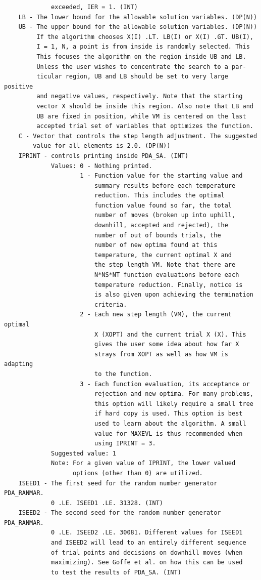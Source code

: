 \documentclass[11pt,twoside]{article}
\begin{document}
\begin{verbatim}
             exceeded, IER = 1. (INT)
    LB - The lower bound for the allowable solution variables. (DP(N))
    UB - The upper bound for the allowable solution variables. (DP(N))
         If the algorithm chooses X(I) .LT. LB(I) or X(I) .GT. UB(I),
         I = 1, N, a point is from inside is randomly selected. This
         This focuses the algorithm on the region inside UB and LB.
         Unless the user wishes to concentrate the search to a par-
         ticular region, UB and LB should be set to very large positive
         and negative values, respectively. Note that the starting
         vector X should be inside this region. Also note that LB and
         UB are fixed in position, while VM is centered on the last
         accepted trial set of variables that optimizes the function.
    C - Vector that controls the step length adjustment. The suggested
        value for all elements is 2.0. (DP(N))
    IPRINT - controls printing inside PDA_SA. (INT)
             Values: 0 - Nothing printed.
                     1 - Function value for the starting value and
                         summary results before each temperature
                         reduction. This includes the optimal
                         function value found so far, the total
                         number of moves (broken up into uphill,
                         downhill, accepted and rejected), the
                         number of out of bounds trials, the
                         number of new optima found at this
                         temperature, the current optimal X and
                         the step length VM. Note that there are
                         N*NS*NT function evaluations before each
                         temperature reduction. Finally, notice is
                         is also given upon achieving the termination
                         criteria.
                     2 - Each new step length (VM), the current optimal
                         X (XOPT) and the current trial X (X). This
                         gives the user some idea about how far X
                         strays from XOPT as well as how VM is adapting
                         to the function.
                     3 - Each function evaluation, its acceptance or
                         rejection and new optima. For many problems,
                         this option will likely require a small tree
                         if hard copy is used. This option is best
                         used to learn about the algorithm. A small
                         value for MAXEVL is thus recommended when
                         using IPRINT = 3.
             Suggested value: 1
             Note: For a given value of IPRINT, the lower valued
                   options (other than 0) are utilized.
    ISEED1 - The first seed for the random number generator PDA_RANMAR.
             0 .LE. ISEED1 .LE. 31328. (INT)
    ISEED2 - The second seed for the random number generator PDA_RANMAR.
             0 .LE. ISEED2 .LE. 30081. Different values for ISEED1
             and ISEED2 will lead to an entirely different sequence
             of trial points and decisions on downhill moves (when
             maximizing). See Goffe et al. on how this can be used
             to test the results of PDA_SA. (INT)


\end{verbatim}
\end{document}
